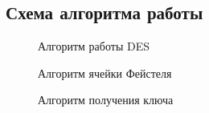 
\subsection{Схема алгоритма работы}

\begin{figure}[h]
    \centering
    \def\svgwidth{0.6\textwidth}
    
    \caption{Алгоритм работы DES}
\end{figure}

\begin{figure}[h]
    \centering
    \def\svgwidth{0.45\textwidth}
    
    \caption{Алгоритм ячейки Фейстеля}
\end{figure}

\begin{figure}[h]
    \centering
    \def\svgwidth{0.45\textwidth}
    
    \caption{Алгоритм получения ключа}
\end{figure}


